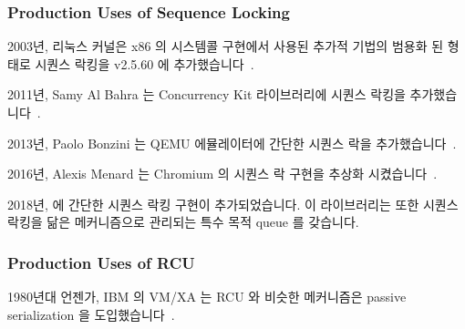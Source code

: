 \fi

\subsubsection{Production Uses of Sequence Locking}
\label{sec:defer:Production Uses of Sequence Locking}

2003년, 리눅스 커널은 x86 의  시스템콜 구현에서 사용된
추가적 기법의 범용화 된 형태로 시퀀스 락킹을 v2.5.60 에
추가했습니다~\cite{JonathanCorbet2003seqlock}.

2011년, Samy Al Bahra 는 Concurrency Kit 라이브러리에 시퀀스 락킹을
추가했습니다~\cite{SamyAlBahra2011ckseqlock}.

2013년, Paolo Bonzini 는 QEMU 에뮬레이터에 간단한 시퀀스 락을
추가했습니다~\cite{PaoloBonzini2013QEMUseqlock}.

2016년, Alexis Menard 는 Chromium 의 시퀀스 락 구현을 추상화
시켰습니다~\cite{AlexisMenard2016ChromiumSeqLock}.

2018년,  에 간단한 시퀀스 락킹 구현이 추가되었습니다.  이
라이브러리는 또한 시퀀스 락킹을 닮은 메커니즘으로 관리되는 특수 목적 queue 를
갖습니다.

\iffalse

The Linux kernel added sequence locking to v2.5.60 in
2003~\cite{JonathanCorbet2003seqlock}, having been generalized from
an ad-hoc technique used in x86's implementation of the
\co{gettimeofday()} system call.

In 2011, Samy Al Bahra added sequence locking to the Concurrency Kit
library~\cite{SamyAlBahra2011ckseqlock}.

Paolo Bonzini added a simple sequence-lock to the QEMU emulator in
2013~\cite{PaoloBonzini2013QEMUseqlock}.

Alexis Menard abstracted a sequence-lock implementation in Chromium
in 2016~\cite{AlexisMenard2016ChromiumSeqLock}.

A simple sequence locking implementation was added to \co{jemalloc()}
in 2018~\cite{DavidGoldblatt2018seqlock}.
The eigen library also has a special-purpose queue that is managed by
a mechanism resembling sequence locking.

\fi

\subsubsection{Production Uses of RCU}
\label{sec:defer:Production Uses of RCU}

1980년대 언젠가, IBM 의 VM/XA 는 RCU 와 비슷한 메커니즘은 passive serialization
을 도입했습니다~\cite{Hennessy89}.

